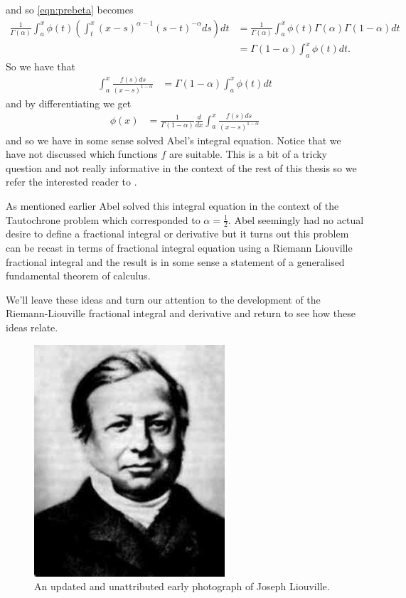 and so \eqref{eqn:prebeta} becomes
\begin{align}
	\frac{1}{\Gamma(\alpha)} \int_a^x \phi(t) \left( \int_t^x (x-s)^{\alpha-1}(s-t)^{-\alpha} ds\right) dt
		&= \frac{1}{\Gamma(\alpha)} \int_a^x \phi(t) \Gamma(\alpha)\Gamma(1-\alpha) dt \\
		&= \Gamma(1-\alpha)\int_a^x \phi(t) dt. 
\end{align}
So we have that 
\begin{align}
	\int_a^x \frac{f(s)ds}{(x-s)^{1-\alpha}} &= \Gamma(1-\alpha)\int_a^x \phi(t) dt
\end{align}
and by differentiating we get
\begin{align}
	\phi(x) &= \frac{1}{\Gamma(1-\alpha)} \frac{d}{dx} \int_a^x \frac{f(s)ds}{(x-s)^{1-\alpha}}
\end{align}
and so we have in some sense solved Abel's integral equation. Notice that we have not discussed which functions $ f $ are suitable. This is a bit of a tricky question and not really informative in the context of the rest of this thesis so we refer the interested reader to \cite{Samko1993}. 

As mentioned earlier Abel solved this integral equation in the context of the Tautochrone problem which corresponded to $ \alpha = \frac{1}{2} $. Abel seemingly had no actual desire to define a fractional integral or derivative but it turns out this problem can be recast in terms of fractional integral equation using a Riemann Liouville fractional integral and the result is in some sense a statement of a generalised fundamental theorem of calculus. 

We'll leave these ideas and turn our attention to the development of the Riemann-Liouville fractional integral and derivative and return to see how these ideas relate.

\begin{figure}
    \includegraphics[scale=0.5]{images/Joseph_liouville}
    \caption{An updated and unattributed early photograph of Joseph Liouville.}
\end{figure}

